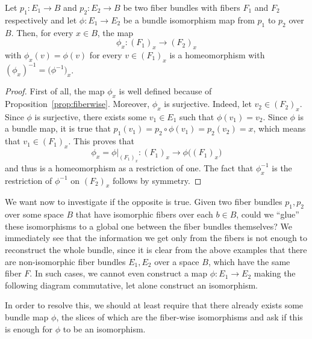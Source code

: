 \begin{proposition}
Let $p_1:E_1\to B$ and $p_2:E_2\to B$ be two fiber bundles with fibers $F_1$ and $F_2$ respectively and let $\phi:E_1\to E_2$ be a bundle isomorphism map from $p_1$ to $p_2$ over $B$. Then, for every $x\in B$, the map
\[\phi_x:{\left(F_1\right)}_x\to{\left(F_2\right)}_x\]
with $\phi_x(v)=\phi(v)$ for every $v\in\left(F_1\right)_x$ is a homeomorphism with $(\phi_x)^{-1}=\big(\phi^{-1}\big)_x$.
\end{proposition}
\begin{proof} First of all, the map $\phi_x$ is well defined because of Proposition~\ref{prop:fiberwise}. Moreover, $\phi_x$ is surjective. Indeed, let $v_2\in (F_2)_x$. Since $\phi$ is surjective, there exists some $v_1\in E_1$ such that $\phi(v_1)=v_2$. Since $\phi$ is a bundle map, it is true that $p_1(v_1)=p_2\circ\phi(v_1)=p_2(v_2)=x$, which means that $v_1\in(F_1)_x$. This proves that
\[\phi_x=\phi|_{{(F_1)}_x}:{(F_1)}_x\to\phi\big({(F_1)}_x\big)\]
and thus is a homeomorphism as a restriction of one. The fact that $\phi_x^{-1}$ is the restriction of $\phi^{-1}$ on ${(F_2)}_x$ follows by symmetry.
\end{proof}

We want now to investigate if the opposite is true. Given two fiber bundles $p_1, p_2$ over some space $B$ that have isomorphic fibers over each $b\in B$, could we ``glue'' these isomorphisms to a global one between the fiber bundles themselves? We immediately see that the information we get only from the fibers is not enough to reconstruct the whole bundle, since it is clear from the above examples that there are non-isomorphic fiber bundles $E_1, E_2$ over a space $B$, which have the same fiber $F$. In such cases, we cannot even construct a map $\phi:E_1\to E_2$ making the following diagram commutative, let alone construct an isomorphism.
\begin{center}
\end{center}
In order to resolve this, we should at least require that there already exists some bundle map $\phi$, the slices of which are the fiber-wise isomorphisms and ask if this is enough for $\phi$ to be an isomorphism.


